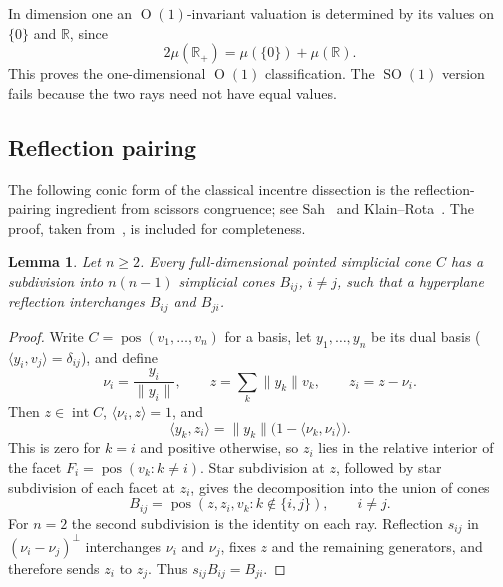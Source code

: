 \documentclass[11pt]{article}
\DeclareMathOperator{\pos}{pos}
\newcommand{\R}{\mathbb{R}}
\newcommand{\ip}[2]{\langle #1,#2\rangle}
\newcommand{\SOn}[1]{\operatorname{SO}(#1)}
\newcommand{\On}[1]{\operatorname{O}(#1)}
\DeclareMathOperator{\inter}{int}
\newtheorem{lemma}[theorem]{Lemma}
\begin{document}
In dimension one an $\On1$-invariant valuation is determined by its
values on $\{0\}$ and $\R$, since
\[
 2\mu(\R_+)=\mu(\{0\})+\mu(\R).
\]
This proves the one-dimensional $\On1$ classification. The $\SOn1$
version fails because the two rays need not have equal values.

\subsection{Reflection pairing}\label{subsec:reflection-pairing}
The following conic form of the classical incentre dissection is the
reflection-pairing ingredient from scissors congruence; see
Sah~\cite{Sah79:Hilberts-Third} and
Klain--Rota~\cite[Proposition~8.3.1 and the remark following Theorem~11.2.1]{KR97:Introduction-Geometric}. The proof, taken from~\cite[Lemma~3.3]{lotz2026monotoneinvariantvaluationsconvex},
is included for completeness.

\begin{lemma}\label{lem:sah-dissection}
Let $n\ge2$. Every full-dimensional pointed simplicial cone $C$ has a subdivision
into $n(n-1)$ simplicial cones $B_{ij}$, $i\ne j$, such that a hyperplane
reflection interchanges $B_{ij}$ and $B_{ji}$.
\end{lemma}

\begin{proof}
Write $C=\pos(v_1,\ldots,v_n)$ for a basis, let $y_1,\ldots,y_n$ be
its dual basis ($\ip{y_i}{v_j}=\delta_{ij}$), and define
\[
 \nu_i=\frac{y_i}{\|y_i\|},\qquad z=\sum_k\|y_k\|v_k,
 \qquad z_i=z-\nu_i.
\]
Then $z\in\inter C$, $\langle\nu_i,z\rangle=1$, and
\[
 \langle y_k,z_i\rangle
 =\|y_k\|\bigl(1-\langle\nu_k,\nu_i\rangle\bigr).
\]
This is zero for $k=i$ and positive otherwise, so $z_i$ lies in the
relative interior of the facet $F_i=\pos(v_k:k\ne i)$.
Star subdivision at $z$, followed by star subdivision of each facet
at $z_i$, gives the decomposition into the union of cones
\[
 B_{ij}=\pos(z,z_i,v_k:k\notin\{i,j\}),\qquad i\ne j.
\]
For $n=2$ the second subdivision is the identity on each ray.
Reflection $s_{ij}$ in $(\nu_i-\nu_j)^\perp$ interchanges $\nu_i$ and
$\nu_j$, fixes $z$ and the remaining generators, and therefore sends
$z_i$ to $z_j$. Thus $s_{ij}B_{ij}=B_{ji}$.
\end{proof}

\end{document}
